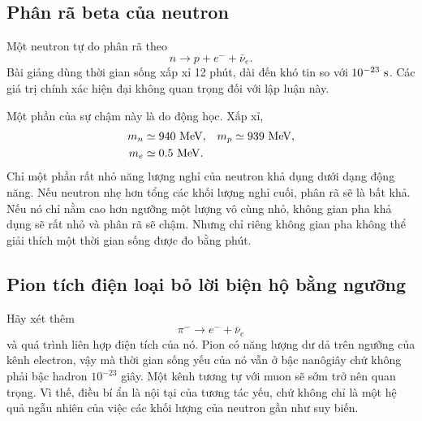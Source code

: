 \subsection{Phân rã beta của neutron}

Một neutron tự do phân rã theo
\begin{equation}
n\longrightarrow p+e^-+\bar\nu_e.
\label{eq:l5-neutron-decay-intro}
\end{equation}
Bài giảng dùng thời gian sống xấp xỉ 12 phút, dài đến khó tin so với \(10^{-23}\ {\rm s}\). Các giá trị chính xác hiện đại không quan trọng đối với lập luận này.

Một phần của sự chậm này là do động học. Xấp xỉ,
\begin{equation}
\begin{aligned}
m_n&\simeq940\ {\rm MeV},
&
m_p&\simeq939\ {\rm MeV},
\\
m_e&\simeq0.5\ {\rm MeV}.
\end{aligned}
\end{equation}
Chỉ một phần rất nhỏ năng lượng nghỉ của neutron khả dụng dưới dạng động năng. Nếu neutron nhẹ hơn tổng các khối lượng nghỉ cuối, phân rã sẽ là bất khả. Nếu nó chỉ nằm cao hơn ngưỡng một lượng vô cùng nhỏ, không gian pha khả dụng sẽ rất nhỏ và phân rã sẽ chậm. Nhưng chỉ riêng không gian pha không thể giải thích một thời gian sống được đo bằng phút.

\subsection{Pion tích điện loại bỏ lời biện hộ bằng ngưỡng}

Hãy xét thêm
\begin{equation}
\pi^-\longrightarrow e^-+\bar\nu_e
\end{equation}
và quá trình liên hợp điện tích của nó. Pion có năng lượng dư dả trên ngưỡng của kênh electron, vậy mà thời gian sống yếu của nó vẫn ở bậc nanôgiây chứ không phải bậc hadron \(10^{-23}\) giây. Một kênh tương tự với muon sẽ sớm trở nên quan trọng. Vì thế, điều bí ẩn là nội tại của tương tác yếu, chứ không chỉ là một hệ quả ngẫu nhiên của việc các khối lượng của neutron gần như suy biến.


